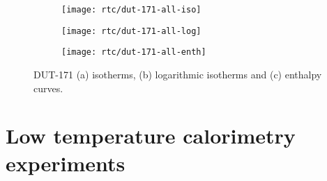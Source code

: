 \begin{figure}[H]
    \centering
    \begin{subfigure}{0.33\linewidth}
        \texttt{[image: rtc/dut-171-all-iso]}%
        \caption{}
    \end{subfigure}%
    \begin{subfigure}{0.33\linewidth}
        \texttt{[image: rtc/dut-171-all-log]}%
        \caption{}
    \end{subfigure}%
    \begin{subfigure}{0.33\linewidth}
        \texttt{[image: rtc/dut-171-all-enth]}%
        \caption{}
    \end{subfigure}%
    \caption{DUT-171 (a) isotherms, (b) logarithmic isotherms and 
    (c) enthalpy curves.}%
    \label{appx:dut:fig:dut-171-butane-rtc}
\end{figure}

\section{Low temperature calorimetry experiments}

